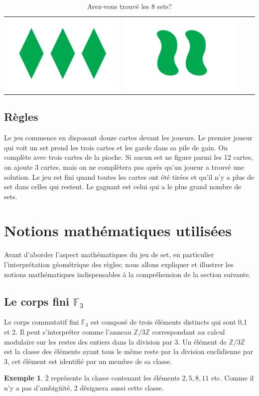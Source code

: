 \documentclass[a4paper,12pt,titlepage]{article}
\theoremstyle{plain}
\theoremstyle{definition}
\newtheorem{ex}{Exemple}
\begin{document}
\begin{table}[h]
\begin{tabular}{ c | c | c | c }
    \includegraphics[scale=0.2]{2012.png} &
    \includegraphics[scale=0.2]{1011.png} \\
  \end{tabular}
  \caption{Avez-vous trouvé les 8 sets?}
\end{table}

\subsection{Règles}
Le jeu commence en disposant douze cartes devant les joueurs.
Le premier joueur qui voit un set prend les trois cartes et les garde dans sa pile de gain. 
On complète avec trois cartes de la pioche. Si aucun set ne figure parmi les 12 cartes, on ajoute 3 cartes, mais on ne complètera pas après qu'un joueur a trouvé une solution.
Le jeu est fini quand toutes les cartes ont été tirées et qu'il n'y a plus de set dans celles qui restent.
Le gagnant est celui qui a le plus grand nombre de sets. 

\newpage
\section{Notions mathématiques utilisées}
Avant d'aborder l'aspect mathématiques du jeu de set, en particulier l'interprétation géométrique des règles; nous allons expliquer et illustrer les notions mathématiques indispensables à la compréhension de la section suivante. 

\subsection{Le corps fini $\mathbb{F}_3$}
Le corps commutatif fini $\mathbb{F}_3$ est composé de trois éléments distincts qui sont 0,1 et 2. Il peut s'interpréter comme l'anneau $\mathbb{Z}/3\mathbb{Z}$ correspondant au calcul modulaire sur les restes des entiers dans la division par 3. Un élément de $\mathbb{Z}/3\mathbb{Z}$ est la classe des éléments ayant tous le même reste par la division euclidienne par 3, cet élément est identifié par un membre de sa classe.
\begin{ex}
  $\bar{2}$ représente la classe contenant les éléments $2,5,8,11$ etc. Comme il n'y a pas d'ambigüité, 2 désignera aussi cette classe.
\end{ex}
\end{document}
